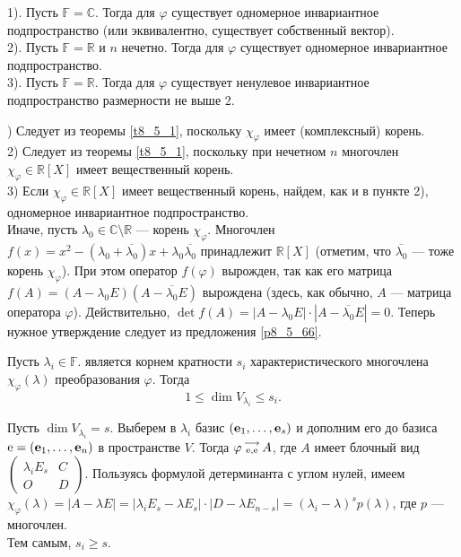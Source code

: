 \begin{theor}\label{t8_5_222}
1). Пусть $\mathbb{F} = \mathbb{C}$. Тогда для $\varphi$ существует одномерное инвариантное подпространство
(или эквивалентно, существует собственный вектор).\\
2). Пусть $\mathbb{F} = \mathbb{R}$ и $n$ нечетно. Тогда для $\varphi$ существует одномерное инвариантное подпространство.\\
3). Пусть $\mathbb{F} = \mathbb{R}$. Тогда для $\varphi$ существует 
ненулевое инвариантное подпространство размерности не выше 2.
\end{theor}
) Следует из теоремы \ref{t8_5_1},  поскольку $\chi_{\varphi}$ имеет (комплексный) корень.\\
2) Следует из теоремы \ref{t8_5_1},  поскольку при нечетном $n$ 
многочлен $\chi_{\varphi}\in \mathbb{R}[X]$ имеет вещественный корень.\\
3) Если $\chi_{\varphi}\in \mathbb{R}[X]$ имеет вещественный корень, найдем, как и в 
пункте 2), одномерное инвариантное подпространство.\\ 
 Иначе, пусть $\lambda_0\in \mathbb{C} \setminus \mathbb{R}$ --- корень $\chi_{\varphi}$.
Многочлен $f (x) = x^2 - (\lambda_0 + \overline{\lambda_0})x + \lambda_0 \overline{\lambda_0}$ 
принадлежит $\mathbb{R}[X]$ (отметим, что  $\overline{\lambda_0}$ --- тоже корень $\chi_{\varphi}$). При этом оператор $f(\varphi)$ вырожден, так как
его матрица $f(A) = (A-\lambda _0 E) (A-\overline{\lambda_0} E)$ вырождена (здесь, как обычно, 
$A$ --- матрица оператора $\varphi$). Действительно, $\det f(A) = 
|A-\lambda _0 E|\cdot |A-\overline{\lambda_0} E| = 0$. Теперь нужное утверждение следует из предложения \ref{p8_5_66}.
\edok



\otstup


\begin{theor}\label{t8_5_2}
Пусть $\lambda_i \in \mathbb{F}$.
 является
корнем кратности $s_i$ характеристического многочлена $\chi_{\varphi}(\lambda)$ преобразования
$\varphi$.
Тогда $$1\leq \dim V_{\lambda _i} \leq s_i.$$
\end{theor}
\dok Пусть $\dim V_{\lambda _i}=s$. Выберем в $\lambda _i$ базис $(\mathbf{e}_1, \ldots, \mathbf{e}_s)$ 
и дополним его до базиса $\mathrm{e}= (\mathbf{e}_1, \ldots, \mathbf{e}_n)$ в пространстве $V$.
Тогда $\varphi \begin{smallmatrix} \longrightarrow \\ \mathrm{e}, \mathrm{e} \end{smallmatrix} A$, где $A$ имеет блочный вид $\begin{pmatrix}
\lambda _i E_s & C \\
O & D
\end{pmatrix}.$ Пользуясь формулой детерминанта с углом нулей, имеем\\ $\chi_{\varphi}(\lambda) = |A-\lambda E| = |\lambda _i E_s- \lambda E_s|\cdot 
|D- \lambda E_{n-s}| = 
(\lambda_i-\lambda)^s p(\lambda)$, где $p$ --- многочлен. \\ Тем самым, $s_i\geq s$.
\edok

